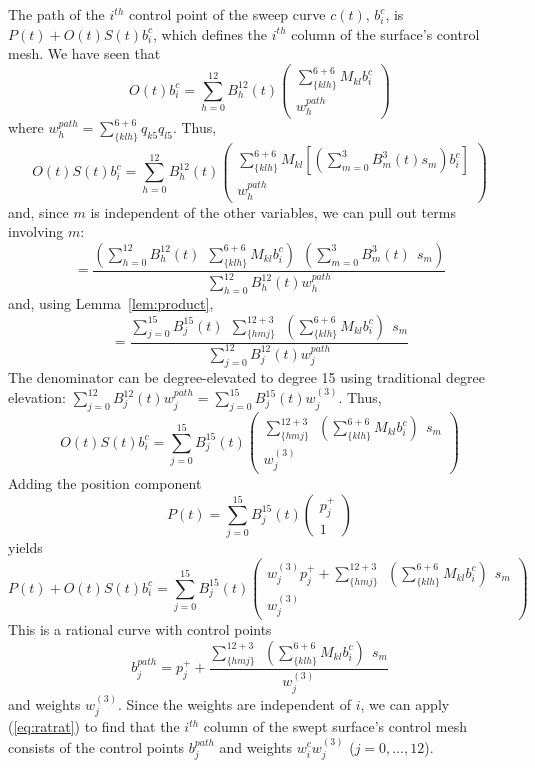\prf
The path of the $i^{th}$ control point of the sweep curve $c(t)$,
$b_i^c$, is $P(t) + O(t)S(t)b_i^c$,
which defines the $i^{th}$ column of the surface's control mesh.
We have seen that 
\[
O(t) b_i^c = 	\sum_{h=0}^{12} B_h^{12}(t) 
	\left(	\begin{array}{c}
	\sum_{\{klh\}}^{6+6} M_{kl} b_i^c \\ w_h^{path}
	\end{array} \right)
\]
where $w_h^{path} = \sum_{\{klh\}}^{6+6} q_{k5} q_{l5}$.
Thus,
\[
O(t)S(t)b_i^c = 
	\sum_{h=0}^{12} B_h^{12}(t) 
	\left(	\begin{array}{c}
	\sum_{\{klh\}}^{6+6} M_{kl} [(\sum_{m=0}^3 B_m^3(t) s_m) b_i^c] \\
	w_h^{path}
	\end{array} \right)
\]
and, since $m$ is independent of the other variables, 
we can pull out terms involving $m$:
\[
 = \frac{(\sum_{h=0}^{12} B_h^{12}(t) \ \ \sum_{\{klh\}}^{6+6} M_{kl} b_i^c) 
	\ \ (\sum_{m=0}^3 B_m^3(t) \ \ s_m)}
     {\sum_{h=0}^{12} B_h^{12}(t) w_h^{path}}
\]
and, using Lemma~\ref{lem:product},
\[
= \frac{\sum_{j=0}^{15} B_j^{15}(t) \ \ \sum_{\{hmj\}}^{12+3} \ \ 
		(\sum_{\{klh\}}^{6+6} M_{kl} b_i^c) \ \ s_m}
     {\sum_{j=0}^{12} B_j^{12}(t) w_j^{path}}
\]
The denominator can be degree-elevated to degree 15 using 
traditional degree elevation:
$\sum_{j=0}^{12} B_j^{12}(t) w_j^{path} = 
 \sum_{j=0}^{15} B_j^{15}(t) w^{(3)}_j$.
Thus,
\[
O(t)S(t)b_i^c = \sum_{j=0}^{15} B_j^{15}(t) 
	\left(	\begin{array}{c}
	\sum_{\{hmj\}}^{12+3} \ \ 
		(\sum_{\{klh\}}^{6+6} M_{kl} b_i^c) \ \ s_m
	\\ w^{(3)}_j
	\end{array} \right)
\]
Adding the position component
\[
P(t) = 	\sum_{j=0}^{15} B_j^{15}(t) 
	\left(	\begin{array}{c}
	p_j^{+} \\ 1
	\end{array} \right)
\]
yields
\[
P(t) + O(t)S(t)b_i^c = 
\sum_{j=0}^{15} B_j^{15}(t) 
	\left(	\begin{array}{c}
	w^{(3)}_j p_j^{+} + 
	\sum_{\{hmj\}}^{12+3} \ \ 
		(\sum_{\{klh\}}^{6+6} M_{kl} b_i^c) \ \ s_m
	\\ w^{(3)}_j
	\end{array} \right)
\]
This is a rational curve with control points
\[
	b_j^{path} = p_j^{+} + \frac{\sum_{\{hmj\}}^{12+3} \ \ 
		(\sum_{\{klh\}}^{6+6} M_{kl} b_i^c) \ \ s_m}{w^{(3)}_j}
\]
and weights $w^{(3)}_j$.
Since the weights are independent of $i$, we can apply (\ref{eq:ratrat})
to find that the $i^{th}$ column of the swept surface's control mesh
consists of the control points $b_j^{path}$ and weights 
$w_i^c  w^{(3)}_j$ ($j=0,\ldots,12$).
\QED

